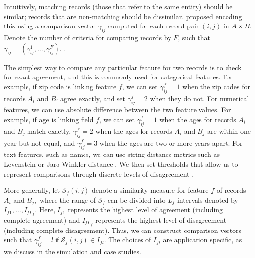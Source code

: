 \documentclass[ba]{imsart}
\begin{document}

Intuitively, matching records (those that refer to the same entity) should be similar; records that are non-matching should be dissimilar. \cite{fellegi_theory_1969} proposed encoding this using a comparison vector $\gamma_{ij}$ computed for each record pair $(i,j)$ in $A \times B.$ Denote the number of criteria for comparing records by $F$, such that $\gamma_{ij} = (\gamma_{ij}^1, \ldots, \gamma_{ij}^F).$ {}.


The simplest way to compare any particular feature for two records is to check for exact agreement, and this is commonly used for categorical features. For example, if zip code is linking feature $f$, we can set $\gamma_{ij}^f=1$ when the zip codes for records $A_i$ and $B_j$ agree exactly, and set $\gamma_{ij}^f=2$ when they do not. For numerical features, we can use absolute difference between the two feature values. For example, if age is linking field $f$, we can set $\gamma_{ij}^f = 1$ when the ages for records $A_i$ and $B_j$ match exactly, $\gamma_{ij}^f = 2$ when the ages for records $A_i$ and $B_j$ are within one year but not equal, and $\gamma_{ij}^f = 3$ when the ages are two or more years apart. For text features, such as names, we can use string distance metrics such as Levenstein or Jaro-Winkler distance \citep{cohen2003comparison}. We then set thresholds that allow us to represent comparisons through discrete levels of disagreement \citep{bilenko2006riddle, elmagarmid_duplicate_2007}. 

More generally, let $\mathcal{S}_f(i,j)$ denote a similarity measure for feature $f$ of records $A_i$ and $B_j,$ where the range of $\mathcal{S}_f$ can be divided into $L_f$ intervals denoted by $I_{f1}, \ldots, I_{fL_f}$. Here, $I_{f1}$ represents the highest level of agreement (including complete agreement) and $I_{fL_f}$ represents the highest level of disagreement (including complete disagreement). Thus, we can construct comparison vectors such that $\gamma_{ij}^f = l \; \text{if} \; \mathcal{S}_f(i,j) \in I_{fl}.$ The choices of $I_{fl}$ are application specific, as we discuss in the simulation and case studies.
\end{document}
